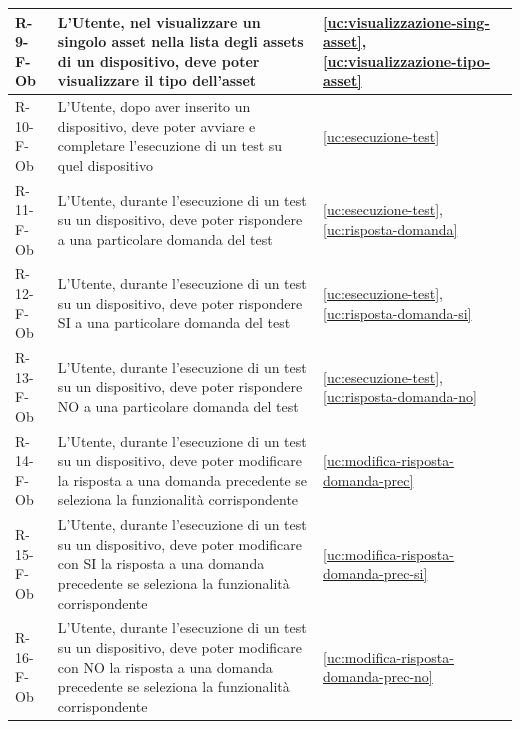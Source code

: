 ﻿\documentclass[a4paper,12pt]{article}
\begin{document}
{{\begin{longtable}{|l|p{}|p{}|}
            R-9-F-Ob        & L'Utente, nel visualizzare un singolo asset nella lista degli assets di un dispositivo, deve poter visualizzare il tipo dell'asset                                                          & \ref{uc:visualizzazione-sing-asset}, \ref{uc:visualizzazione-tipo-asset}               \\ \hline
            R-10-F-Ob       & L'Utente, dopo aver inserito un dispositivo, deve poter avviare e completare l'esecuzione di un test su quel dispositivo                                                                    & \ref{uc:esecuzione-test}                                                 \\ \hline
            R-11-F-Ob       & L'Utente, durante l'esecuzione di un test su un dispositivo, deve poter rispondere a una particolare domanda del test                                                                       & \ref{uc:esecuzione-test}, \ref{uc:risposta-domanda}                     \\ \hline
            R-12-F-Ob       & L'Utente, durante l'esecuzione di un test su un dispositivo, deve poter rispondere SI a una particolare domanda del test                                                                       & \ref{uc:esecuzione-test}, \ref{uc:risposta-domanda-si}                     \\ \hline
            R-13-F-Ob       & L'Utente, durante l'esecuzione di un test su un dispositivo, deve poter rispondere NO a una particolare domanda del test                                                                       & \ref{uc:esecuzione-test}, \ref{uc:risposta-domanda-no}                     \\ \hline
            R-14-F-Ob       & L'Utente, durante l'esecuzione di un test su un dispositivo, deve poter modificare la risposta a una domanda precedente se seleziona la funzionalità corrispondente                         & \ref{uc:modifica-risposta-domanda-prec}                                                 \\ \hline
            R-15-F-Ob       & L'Utente, durante l'esecuzione di un test su un dispositivo, deve poter modificare con SI la risposta a una domanda precedente se seleziona la funzionalità corrispondente                         & \ref{uc:modifica-risposta-domanda-prec-si}                                                 \\ \hline
            R-16-F-Ob       & L'Utente, durante l'esecuzione di un test su un dispositivo, deve poter modificare con NO la risposta a una domanda precedente se seleziona la funzionalità corrispondente                         & \ref{uc:modifica-risposta-domanda-prec-no}                                                 \\ \hline

\end{longtable}}}
\end{document}
